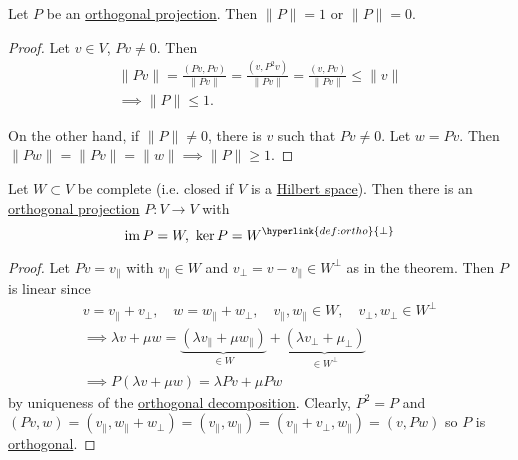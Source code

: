 \documentclass{article}
\DeclareMathOperator{\im}{im}
\begin{document}
\begin{fact}
    Let $P$ be an \hyperlink{def:proj}{orthogonal projection}. Then $\|P\| = 1$ or $\|P\| = 0$.
\end{fact}

\begin{proof}
    Let $v \in V$, $Pv \neq 0$. Then
    \begin{gather*}
        \|Pv\| = \frac{(Pv, Pv)}{\|Pv\|} = \frac{(v, P^2v)}{\|Pv\|} = \frac{(v, Pv)}{\|Pv\|} \leq \|v\| \\
        \implies \|P\| \leq 1.
    \end{gather*}

    On the other hand, if $\|P\| \neq 0$, there is $v$ such that $Pv \neq 0$. Let $w = Pv$. Then $\|Pw\| = \|Pv\| = \|w\| \implies \|P\| \geq 1$.
\end{proof}

\begin{cor}
    Let $W \subset V$ be complete (i.e. closed if $V$ is a \hyperlink{def:euclidean}{Hilbert space}).
    Then there is an \hyperlink{def:proj}{orthogonal projection} $P:V \to V$ with
    \begin{equation*}
        \im P = W,\ \ker P = W^{\hyperlink{def:ortho}{\perp}}
    \end{equation*}
\end{cor}

\begin{proof}
    Let $Pv = v_\parallel$ with $v_\parallel \in W$ and $v_\perp = v - v_\parallel \in W^\perp$ as in the theorem.
    Then $P$ is linear since
    \begin{gather*}
        v = v_\parallel + v_\perp, \quad w = w_\parallel + w_\perp, \quad v_\parallel, w_\parallel \in W, \quad v_\perp, w_\perp \in W^\perp \\
        \implies \lambda v + \mu w = \underbrace{(\lambda v_\parallel + \mu w_\parallel)}_{\in W} + \underbrace{(\lambda v_\perp + \mu_\perp)}_{\in W^\perp} \\
        \implies P(\lambda v + \mu w) = \lambda P v + \mu P w
    \end{gather*}
    by uniqueness of the \hyperlink{def:ortho}{orthogonal decomposition}.
    Clearly, $P^2 = P$ and $(Pv, w) = (v_\parallel, w_\parallel + w_\perp) = (v_\parallel, w_\parallel) = (v_\parallel + v_\perp, w_\parallel) = (v, Pw)$ so $P$ is \hyperlink{def:proj}{orthogonal}.
\end{proof}
\end{document}

